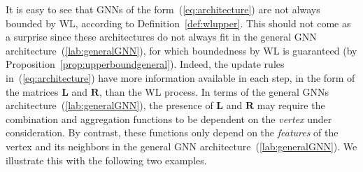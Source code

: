 
It is easy to see that GNNs of the form~(\ref{eq:architecture}) are not always bounded by WL, according to 
Definition~\ref{def:wlupper}. This should not come as a surprise since these architectures do not always fit in the general
GNN architecture~(\ref{lab:generalGNN}), for which boundedness by WL is guaranteed (by Proposition~\ref{prop:upperboundgeneral}).
Indeed, the update rules in~(\ref{eq:architecture})  have more information available in each step, in the form of the matrices $\mathbf{L}$ and $\mathbf{R}$, than the WL process. In terms of the general GNNs architecture~(\ref{lab:generalGNN}), the presence of $\mathbf{L}$ and $\mathbf{R}$ may require the combination and aggregation functions to be dependent on the \textit{vertex} under consideration. By contrast, these functions only depend on the \textit{features} of the vertex and its neighbors in the general GNN architecture~(\ref{lab:generalGNN}). We illustrate this with the following two examples.

